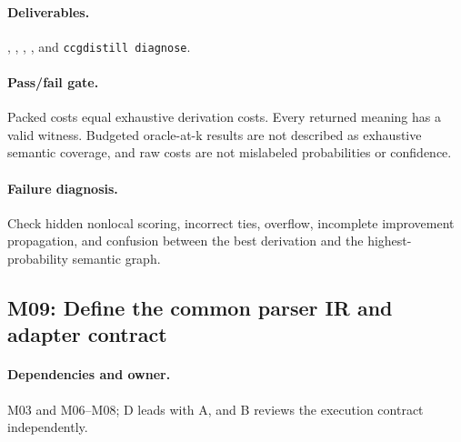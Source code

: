 \documentclass[11pt,a4paper]{article}
\begin{document}
\paragraph{Deliverables.} , , , , and \texttt{ccgdistill diagnose}.

\paragraph{Pass/fail gate.} Packed costs equal exhaustive derivation costs. Every returned meaning has a valid witness. Budgeted oracle-at-k results are not described as exhaustive semantic coverage, and raw costs are not mislabeled probabilities or confidence.

\paragraph{Failure diagnosis.} Check hidden nonlocal scoring, incorrect ties, overflow, incomplete improvement propagation, and confusion between the best derivation and the highest-probability semantic graph.

\subsection{M09: Define the common parser IR and adapter contract}

\paragraph{Dependencies and owner.} M03 and M06--M08; D leads with A, and B
reviews the execution contract independently.
\end{document}

